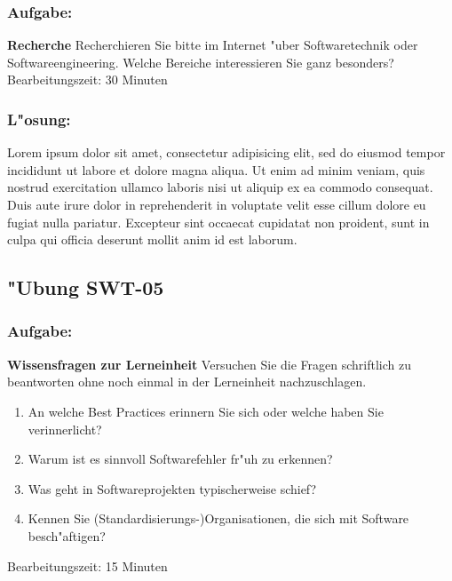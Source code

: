 \subsubsection*{Aufgabe:}

\begin{framed}
\textbf{Recherche}
\smallbreak
Recherchieren Sie bitte im Internet "uber Softwaretechnik oder Softwareengineering. Welche Bereiche interessieren Sie ganz besonders?
\bigbreak
\small Bearbeitungszeit: 30 Minuten
\end{framed}
\bigbreak
\bigbreak
\subsubsection*{L"osung:}
Lorem ipsum dolor sit amet, consectetur adipisicing elit, sed do eiusmod tempor incididunt ut labore et dolore magna aliqua. Ut enim ad minim veniam, quis nostrud exercitation ullamco laboris nisi ut aliquip ex ea commodo consequat. Duis aute irure dolor in reprehenderit in voluptate velit esse cillum dolore eu fugiat nulla pariatur. Excepteur sint occaecat cupidatat non proident, sunt in culpa qui officia deserunt mollit anim id est laborum.

\newpage
\subsection{"Ubung SWT-05}
\subsubsection*{Aufgabe:}

\begin{framed}
\textbf{Wissensfragen zur Lerneinheit}
\smallbreak
Versuchen Sie die Fragen schriftlich zu beantworten ohne noch einmal in der Lerneinheit nachzuschlagen.
\begin{enumerate}
\item An welche Best Practices erinnern Sie sich oder welche haben Sie verinnerlicht?
\item Warum ist es sinnvoll Softwarefehler fr"uh zu erkennen?
\item Was geht in Softwareprojekten typischerweise schief?
\item Kennen Sie (Standardisierungs-)Organisationen, die sich mit Software besch"aftigen?
\end{enumerate}
\bigbreak
\small Bearbeitungszeit: 15 Minuten
\end{framed}
\bigbreak
\bigbreak
